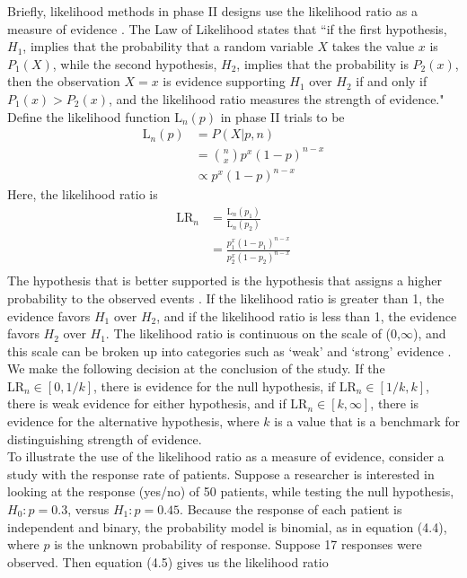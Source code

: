 \documentclass[12pt]{report}\usepackage[]{graphicx}\usepackage[]{color}
\newlength{\li}\setlength{\li}{14.48pt}
\newlength{\di}\setlength{\di}{-3.5mm}
\begin{document}
Briefly, likelihood methods in phase II designs use the likelihood ratio as a measure of evidence \cite{Ayers}. The Law of Likelihood states that ``if the first hypothesis, $H_1$, implies that the probability that a random variable $X$ takes the value $x$ is $P_1(X)$, while the second hypothesis, $H_2$, implies that the probability is $P_2(x)$, then the observation $X=x$ is evidence supporting $H_1$ over $H_2$ if and only if $P_1(x) > P_2(x)$, and the likelihood ratio measures the strength of evidence." \cite{Blume2002} Define the likelihood function $\mbox{L}_n(p)$ in phase II trials to be 
\begin{equation}
\begin{aligned}
\mbox{L}_n(p) &= P(X \vert p, n) \\
&= {n \choose x} p^x (1-p)^{n-x} \\
& \propto p^x (1-p)^{n-x}
\end{aligned}
\end{equation}
Here, the likelihood ratio is 
\begin{equation}
\begin{aligned}
\mbox{LR}_n & = \frac{\mbox{L}_n(p_1)}{\mbox{L}_n(p_2)} \\
&= \frac{p_1^{x}(1-p_1)^{n-x}}{p_2^{x}(1-p_2)^{n-x}} \\
\end{aligned}
\end{equation}
The hypothesis that is better supported is the hypothesis that assigns a higher probability to the observed events \cite{Blume2002}. If the likelihood ratio is greater than 1, the evidence favors $H_1$ over $H_2$, and if the likelihood ratio is less than 1, the evidence favors $H_2$ over $H_1$. The likelihood ratio is continuous on the scale of (0,$\infty$), and this scale can be broken up into categories such as `weak' and `strong' evidence \cite{Blume2002}. We make the following decision at the conclusion of the study. If the $\mbox{LR}_n \in [0, 1/k]$, there is evidence for the null hypothesis, if $\mbox{LR}_n \in [1/k,k]$, there is weak evidence for either hypothesis, and if $\mbox{LR}_n \in [k,\infty]$, there is evidence for the alternative hypothesis, where $k$ is a value that is a benchmark for distinguishing strength of evidence. \\
\indent To illustrate the use of the likelihood ratio as a measure of evidence, consider a study with the response rate of patients. Suppose a researcher is interested in looking at the response (yes/no) of 50 patients, while testing the null hypothesis, $H_0: p = 0.3$, versus $H_1: p = 0.45$. Because the response of each patient is independent and binary, the probability model is binomial, as in equation (4.4), where $p$ is the unknown probability of response. Suppose 17 responses were observed. Then equation (4.5) gives us the likelihood ratio     
\end{document}
